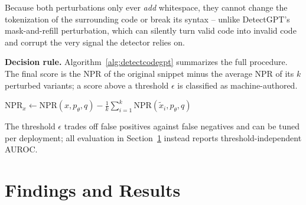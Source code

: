\documentclass[manuscript,review]{acmart}
\begin{document}
Because both perturbations only ever \emph{add} whitespace, they cannot change the tokenization of the surrounding code or break its syntax -- unlike DetectGPT's mask-and-refill perturbation, which can silently turn valid code into invalid code and corrupt the very signal the detector relies on.

\textbf{Decision rule.} Algorithm~\ref{alg:detectcodegpt} summarizes the full procedure. The final score is the NPR of the original snippet minus the average NPR of its $k$ perturbed variants; a score above a threshold $\epsilon$ is classified as machine-authored.



\begin{algorithm}[t]
\caption{DetectCodeGPT: machine-generated code detection via stylized code perturbation}
\label{alg:detectcodegpt}
$\displaystyle \mathrm{NPR}_x \leftarrow \mathrm{NPR}(x,p_\theta,q) - \frac{1}{k}\sum_{i=1}^{k} \mathrm{NPR}(\tilde{x}_i,p_\theta,q)$\;
\end{algorithm}


The threshold $\epsilon$ trades off false positives against false negatives and can be tuned per deployment; all evaluation in Section~\ref{sec:results} instead reports threshold-independent AUROC.



\section{Findings and Results}
\label{sec:results}
\end{document}

